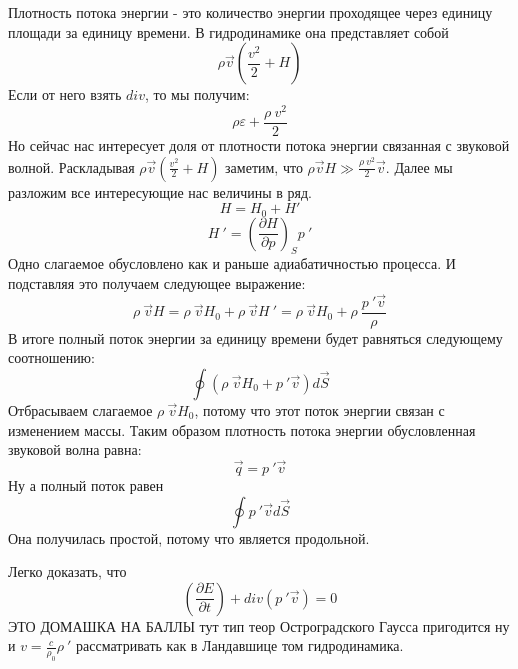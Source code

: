 \documentclass[14pt,a4paper,oneside]{extarticle}	%
\newcommand{\bracket}[1] {\left( #1 \right) } %
\newcommand{\dif}[2] {\bracket{ \frac{\partial #1}{\partial #2} }}
\begin{document}
Плотность потока энергии - это количество энергии проходящее через единицу площади за единицу времени.
В гидродинамике она представляет собой 
\begin{equation*}
\rho \vec{v} \bracket{\frac{v^{2}}{2} + H}
\end{equation*}
Если от него взять $ div $, то мы получим:
\begin{equation*}
\rho \varepsilon + \frac{\rho\:v^{2}}{2} 
\end{equation*}
Но сейчас нас интересует доля от плотности потока энергии связанная с звуковой волной.
Раскладывая $ \rho \vec{v} \bracket{\frac{v^{2}}{2} + H} $ заметим, что $  \rho \vec{v}H \gg \frac{\rho\:v^{2}}{2}\vec{v} $. Далее мы разложим все интересующие нас величины в ряд.
\begin{equation*}
H = H_{0} + H'
\end{equation*}
\begin{equation*}
H\:' = \dif{H}{p}_{S}p\:'
\end{equation*}
Одно слагаемое обусловлено как и раньше адиабатичностью процесса. И подставляя это получаем следующее выражение:
\begin{equation*}
 \rho\:\vec{v}H = \rho\:\vec{v}H_{0} + \rho\:\vec{v}H\:' = \rho\:\vec{v}H_{0} + \rho\:\frac{p\:'\vec{v}}{\rho}
\end{equation*}
В итоге полный поток энергии за единицу времени будет равняться следующему соотношению:
\begin{equation*}
\oint \bracket{ \rho\:\vec{v}H_{0} + p\:'\vec{v}}d \vec{S}
\end{equation*}
Отбрасываем слагаемое $ \rho\:\vec{v}H_{0} $, потому что этот поток энергии связан с изменением массы.
Таким  образом плотность потока энергии обусловленная звуковой волна равна:
\begin{equation}\label{63}
\vec{q} = p\:'\vec{v}
\end{equation}
Ну а полный поток равен 
\begin{equation*}
\oint p\:'\vec{v} d \vec{S}
\end{equation*}
Она получилась простой, потому что является продольной.

Легко доказать, что 
\begin{equation*}
\dif{E}{t} + div(p\:'\vec{v}) = 0 
\end{equation*}
ЭТО ДОМАШКА НА БАЛЛЫ тут тип теор Остроградского Гаусса пригодится ну и $ v = \frac{c}{\rho_{0}}\rho\:' $ рассматривать как в Ландавшице том гидродинамика.
\end{document}
